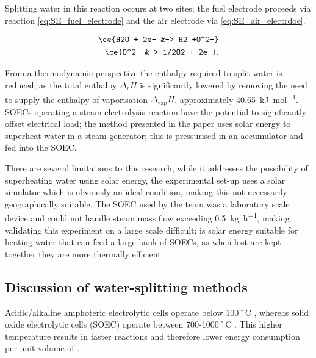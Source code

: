Splitting water in this reaction occurs at two sites; the fuel electrode proceeds via reaction \eqref{eq:SE_fuel_electrode} and the air electrode via \eqref{eq:SE_air_electrdoe}.\cite{Schiller2019}

\begin{align}
	\ce{H2O + 2e- &-> H2 +O^2-}\label{eq:SE_fuel_electrode}\\
	\ce{O^2- &-> 1/2O2 + 2e-}\label{eq:SE_air_electrode}
.\end{align}

From a thermodynamic perspective the enthalpy required to split water is reduced, as the total enthalpy $\Delta_{r}H$ is significantly lowered by removing the need to supply the enthalpy of vaporisation $\Delta_{\text{vap}}H$, approximately \SI{40.65}{\kilo\joule\per\mole}\cite{Lemmon2017}.
SOECs operating a steam electrolysis reaction have the potential to significantly offset electrical load; the method presented in the paper uses solar energy to superheat water in a steam generator; this is pressurised in an accumulator and fed into the SOEC. 

There are several limitations to this research, while it addresses the possibility of superheating water using solar energy, the experimental set-up uses a solar simulator which is obviously an ideal condition, making this not necessarily geographically suitable.
The SOEC used by the team was a laboratory scale device and could not handle steam mass flow exceeding \SI{0.5}{\kilo\gram\per\hour}, making validating this experiment on a large scale difficult; is solar energy suitable for heating water that can feed a large bank of SOECs, as when lost are kept together they are more thermally efficient.


\subsection{Discussion of water-splitting methods}%
\label{sub:discussion_of_water_splitting_methods}

Acidic/alkaline amphoteric  electrolytic cells operate below 100˚C \cite{Lei2019}, whereas solid oxide electrolytic cells (SOEC) operate between 700-1000˚C \cite{Schiller2019}.
This higher temperature results in faster reactions and therefore lower energy consumption per unit volume of .

